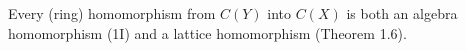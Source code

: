 Every (ring) homomorphism from $C(Y)$ into $C(X)$ is both an algebra homomorphism (1I) and a lattice homomorphism (Theorem 1.6).

